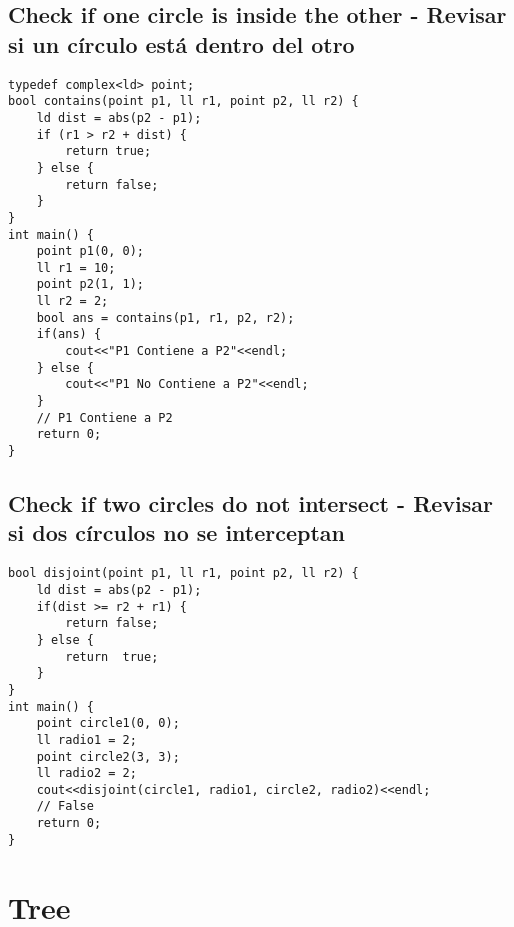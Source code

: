 \documentclass[10pt,letterpaper,twocolumn,twosided]{article}
\begin{document}
\subsection{Check if one circle is inside the other - Revisar si un círculo está dentro del otro}
\begin{lstlisting}
typedef complex<ld> point;
bool contains(point p1, ll r1, point p2, ll r2) {
    ld dist = abs(p2 - p1);
    if (r1 > r2 + dist) {
        return true;
    } else {
        return false;
    }
}
int main() {
    point p1(0, 0);
    ll r1 = 10;
    point p2(1, 1);
    ll r2 = 2;
    bool ans = contains(p1, r1, p2, r2);
    if(ans) {
        cout<<"P1 Contiene a P2"<<endl;
    } else {
        cout<<"P1 No Contiene a P2"<<endl;
    }
    // P1 Contiene a P2
    return 0;
}
\end{lstlisting}





\subsection{Check if two circles do not intersect - Revisar si dos círculos no se interceptan}
\begin{lstlisting}
bool disjoint(point p1, ll r1, point p2, ll r2) {
    ld dist = abs(p2 - p1);
    if(dist >= r2 + r1) {
        return false;
    } else {
        return  true;
    }
}
int main() {
    point circle1(0, 0);
    ll radio1 = 2;
    point circle2(3, 3);
    ll radio2 = 2;
    cout<<disjoint(circle1, radio1, circle2, radio2)<<endl;
    // False
    return 0;
}
\end{lstlisting}



                     


\section{Tree}
\end{document}
